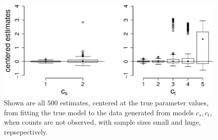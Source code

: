 \begin{figure}
  \centering
  \includegraphics[scale=0.5]{em_bp}
  \caption{Shown are all $500$ estimates, centered at the true parameter values, from fitting the true model to the data generated from models $c_s,c_t$, when counts are not observed, with sample sizes small and huge, repsepectively.}
  \label{fig:em_bp}
\end{figure}


